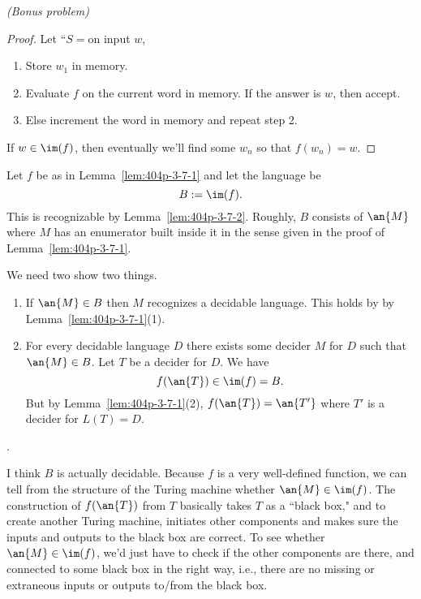 \begin{problem}{\it(Bonus problem)}
\begin{proof}
Let ``$S=$on input $w$,
\begin{enumerate}
\item
Store $w_1$ in memory.
\item Evaluate $f$ on the current word in memory. If the answer is $w$, then accept.
\item
Else increment the word in memory and repeat step 2.
\end{enumerate}
If $w\in \im(f)$, then eventually we'll find some $w_n$ so that $f(w_n)=w$.
\end{proof}
%
Let $f$ be as in Lemma~\ref{lem:404p-3-7-1} and let the language be 
\[
B:=\im(f).
\]
This is recognizable by Lemma~\ref{lem:404p-3-7-2}. 
Roughly, $B$ consists of $\an{M}$ where $M$ has an enumerator built inside it in the sense given in the proof of Lemma~\ref{lem:404p-3-7-1}.

We need two show two things.
\begin{enumerate}
\item
If $\an{M}\in B$ then $M$ recognizes a decidable language. This holds by %
by Lemma~\ref{lem:404p-3-7-1}(1).
\item
For every decidable language $D$ there exists some decider $M$ for $D$ such that $\an{M}\in B$. Let $T$ be a decider for $D$. We have
\[
f(\an{T})\in \im(f)=B.
\]
But by Lemma~\ref{lem:404p-3-7-1}(2), $f(\an{T})=\an{T'}$ where  $T'$ is a decider for $L(T)=D$.
\end{enumerate}
\vskip2in.
\begin{rem}
I think $B$ is actually decidable. Because $f$ is a very well-defined function, we can tell from the structure of the Turing machine whether $\an{M}\in \im(f)$. The construction of $f(\an{T})$ from $T$ basically takes $T$ as a ``black box," and to create another Turing machine, initiates other components and makes sure the inputs and outputs to the black box are correct. To see whether $\an{M}\in \im(f)$, we'd just have to check if the other components are there, and connected to some black box in the right way, i.e., there are no missing or extraneous inputs or outputs to/from the black box.
\end{rem}
\end{problem}
